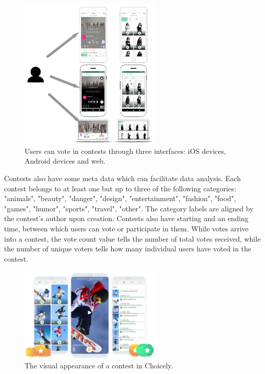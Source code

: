     \begin{figure}[h]
        \begin{center}
            \includegraphics[width=0.6\textwidth]{images/choicely_platforms.png}
            \caption{Users can vote in contests through three interfaces: iOS devices, Android devices and web.}
            \label{choicely_platforms}
        \end{center}
    \end{figure} 

    Contests also have some meta data which can facilitate data analysis. Each contest belongs to at least one but up to three of the following categories: "animals", "beauty", "danger", "design", "entertainment", "fashion", "food", "games", "humor", "sports", "travel", "other". The category labels are aligned by the contest's author upon creation. Contests also have starting and an ending time, between which users can vote or participate in them. While votes arrive into a contest, the vote count value tells the number of total votes received, while the number of unique voters tells how many individual users have voted in the contest. 

    \begin{figure}[h] 
        \begin{center}
            \includegraphics[width=0.6\textwidth]{images/vote_trick_of_the_day.png}
            \caption{The visual appearance of a contest in Choicely.}
            \label{vote_trick_of_the_day}
        \end{center}
    \end{figure}

